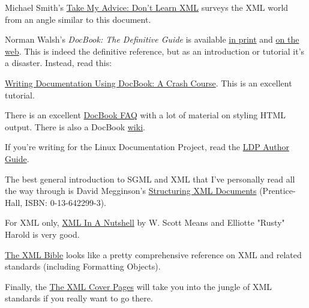 \documentclass[pdftex,english,a4paper,10pt]{infocom}
\begin{document}
Michael Smith's \href{http://xml.oreilly.com/news/dontlearn_0701.html}{
Take My Advice: Don't Learn XML} surveys the XML world from
an angle similar to this document.

Norman Walsh's {\em DocBook: The Definitive
Guide} is available \href{http://www.oreilly.com/catalog/docbook/}{in print} and
\href{http://www.docbook.org/tdg/en/html/docbook.html}{on the
web}.  This is indeed the definitive reference, but as an
introduction or tutorial it's a disaster.  Instead, read this:

\href{http://www.bureau-cornavin.com/opensource/crash-course/index.html}{Writing 
Documentation Using DocBook: A Crash Course}.  This is an excellent
tutorial.

There is an excellent \href{http://www.dpawson.co.uk/docbook/}{DocBook FAQ} with a lot
of material on styling HTML output.  There is also a DocBook \href{http://docbook.org/wiki/moin.cgi}{wiki}.

If you're writing for the Linux Documentation Project, read the
\href{http://www.linuxdoc.org/LDP/LDP-Author-Guide/index.html}{
LDP Author Guide}.

The best general introduction to SGML and XML that I've
personally read all the way through is David Megginson's \href{http://vig.pearsoned.com/store/product/0,,store-562_banner-0_isbn-0136422993,00.html}{Structuring
XML Documents} (Prentice-Hall, ISBN: 0-13-642299-3).

For XML only, \href{http://www.oreilly.com/catalog/xmlnut2/}{XML In A Nutshell}
by W. Scott Means and Elliotte "Rusty" Harold is very good.

\href{http://www.ibiblio.org/xml/books/bible/}{The XML
Bible} looks like a pretty comprehensive reference on XML and
related standards (including Formatting Objects).

Finally, the \href{http://xml.coverpages.org/}{The XML
Cover Pages} will take you into the jungle of XML standards
if you really want to go there.

\end{document}

